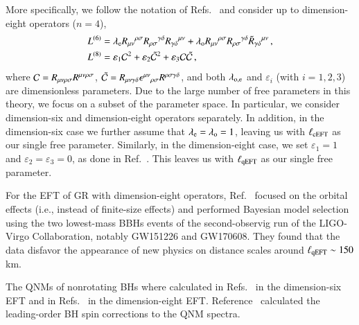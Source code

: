 \documentclass[twocolumn,
               prd,
               aps,
               superscriptaddress,
               tightenlines,
               nofootinbib,
               eqsecnum,
               amsfonts,
               amsmath,
               longbibliography]{revtex4-1}
\newcommand{\lame}{\lambda_{\rm e}}
\newcommand{\lamo}{\lambda_{\rm o}}
\begin{document}
More specifically, we follow the notation of
Refs.~\cite{Cano:2020cao,Cano:2021myl} and consider up to dimension-eight
operators ($n=4$),
%
\begin{subequations}
\label{eq:action_mods}
\begin{align}
    L^{(6)} &= \lame R_{\mu\nu}{}^{\rho\sigma} R_{\rho\sigma}{}^{\gamma\delta} R_{\gamma \delta}{}^{\mu\nu}
    + \lamo R_{\mu\nu}{}^{\rho\sigma} R_{\rho\sigma}{}^{\gamma\delta} \tilde{R}_{\gamma \delta}{}^{\mu\nu}\,,
    \label{eq:s_6}
    \\
    L^{(8)} &= \varepsilon_{1} \mathcal{C}^2
    + \varepsilon_{2} \tilde{\mathcal{C}}^{2}
    + \varepsilon_{3} \mathcal{C} \tilde{\mathcal{C}}\,,
\label{eq:s_8}
\end{align}
\end{subequations}
%
where ${\cal C} = R_{\mu\nu\rho\sigma} R^{\mu\nu\rho\sigma}$,
$\tilde{\cal C} = R_{\mu\nu\gamma\delta} \epsilon^{\mu\nu}{}_{\rho\sigma} R^{\rho\sigma\gamma\delta}$,
and both $\lambda_{\rm o, e}$ and $\varepsilon_{i}$ (with $i=1, 2, 3$) are dimensionless parameters.
%
Due to the large number of free parameters in this theory, we focus on a subset of the parameter space.
%
In particular, we consider dimension-six and dimension-eight operators separately.
%
In addition, in the dimension-six case we further assume that $\lame = \lamo = 1$,
leaving us with $\ell_{\rm cEFT}$ as our single free parameter.
%
Similarly, in the dimension-eight case, we set $\varepsilon_{1} = 1$ and $\varepsilon_{2} = \varepsilon_{3} = 0$,
as done in Ref.~\cite{Sennett:2019bpc}.
%
This leaves us with $\ell_{\rm qEFT}$ as our single free parameter.


For the EFT of GR with dimension-eight operators, Ref.~\cite{Sennett:2019bpc} focused on the
orbital effects (i.e., instead of finite-size effects) and performed
Bayesian model selection using the two lowest-mass BBHs events of the second-observig run of
the LIGO-Virgo Collaboration, notably GW151226 and GW170608. They found that the
data disfavor the appearance of new physics on distance scales around $\ell_{\rm qEFT} \sim 150$ km.

The QNMs of nonrotating BHs where calculated in Refs.~\cite{deRham:2020ejn,Cano:2020cao} in the dimension-six EFT
and in Refs.~\cite{Cardoso:2018ptl,Cano:2020cao} in the dimension-eight EFT.
%
Reference~\cite{Cano:2020cao} calculated the leading-order BH spin corrections to the QNM spectra.

\end{document}
